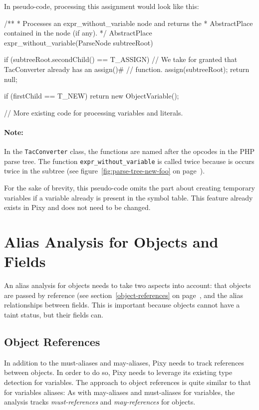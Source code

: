 In pseudo-code, processing this assignment would look like this:

\begin{textcode}
/**
 * Processes an expr_without_variable node and returns the
 * AbstractPlace contained in the node (if any).
 */
AbstractPlace expr_without_variable(ParseNode subtreeRoot) {
  if (subtreeRoot.secondChild() == T_ASSIGN) {
    // We take for granted that TacConverter already has an assign()#
    // function.
    assign(subtreeRoot);
    return null;
  }

  if (firstChild == T_NEW) {
    return new ObjectVariable();
  }

  // More existing code for processing variables and literals.
}
\end{textcode}

\paragraph{Note:} In the \texttt{TacConverter} class, the functions are named after the opcodes in the PHP parse tree. The function \texttt{expr\_without\_variable} is called twice because is occurs twice in the subtree (see figure~\ref{fig:parse-tree-new-foo} on page~\pageref{fig:parse-tree-new-foo}).

For the sake of brevity, this pseudo-code omits the part about creating temporary variables if a variable already is present in the symbol table. This feature already exists in Pixy and does not need to be changed.


\section{Alias Analysis for Objects and Fields}

An alias analysis for objects needs to take two aspects into account: that objects are passed by reference (see section~\ref{object-references} on page~\pageref{object-references}, and the alias relationships between fields. This is important because objects cannot have a taint status, but their fields can.


\subsection{Object References}

In addition to the must-aliases and may-aliases, Pixy needs to track references between objects. In order to do so, Pixy needs to leverage its existing type detection for variables. The approach to object references is quite similar to that for variables aliases: As with may-aliases and must-aliases for variables, the analysis tracks \emph{must-references} and \emph{may-references} for objects.

